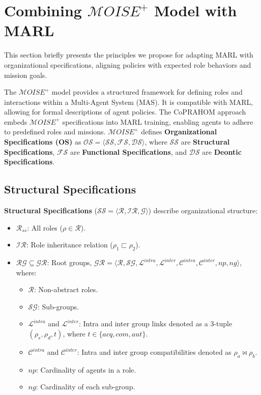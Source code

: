 \documentclass[conference]{IEEEtran}
\newcounter{relation}
\begin{document}
\section{Combining $\mathcal{M}OISE^+$ Model with MARL}
\label{sec:marl_moise_linking}

This section briefly presents the principles we propose for adapting MARL with organizational specifications, aligning policies with expected role behaviors and mission goals.

The $\mathcal{M}OISE^+$ model provides a structured framework for defining roles and interactions within a Multi-Agent System (MAS). It is compatible with MARL, allowing for formal descriptions of agent policies. The CoPRAHOM approach embeds $\mathcal{M}OISE^+$ specifications into MARL training, enabling agents to adhere to predefined roles and missions. $\mathcal{M}OISE^+$ defines \textbf{Organizational Specifications (OS)} as $\mathcal{OS} = \langle \mathcal{SS}, \mathcal{FS}, \mathcal{DS} \rangle$, where $\mathcal{SS}$ are \textbf{Structural Specifications}, $\mathcal{FS}$ are \textbf{Functional Specifications}, and $\mathcal{DS}$ are \textbf{Deontic Specifications}.

\subsection{Structural Specifications}

\textbf{Structural Specifications} ($\mathcal{SS} = \langle \mathcal{R}, \mathcal{IR}, \mathcal{G} \rangle$) describe organizational structure:
\begin{itemize}
    \item $\mathcal{R}_{ss}$: All roles ($\rho \in \mathcal{R}$).
    \item $\mathcal{IR}$: Role inheritance relation ($\rho_1 \sqsubset \rho_2$).
    \item $\mathcal{RG} \subseteq \mathcal{GR}$: Root groups, $\mathcal{GR} = \langle \mathcal{R}, \mathcal{SG}, \mathcal{L}^{intra}, \mathcal{L}^{inter}, \mathcal{C}^{intra}, \mathcal{C}^{inter}, np, ng \rangle$, where:
          \begin{itemize}
              \item $\mathcal{R}$: Non-abstract roles.
              \item $\mathcal{SG}$: Sub-groups.
              \item $\mathcal{L}^{intra}$ and $\mathcal{L}^{inter}$: Intra and inter group links denoted as a 3-tuple $(\rho_s, \rho_d, t)$, where $t \in \{acq, com, aut\}$.
              \item $\mathcal{C}^{intra}$ and $\mathcal{C}^{inter}$: Intra and inter group compatibilities denoted as $\rho_a \bowtie \rho_b$.
              \item $np$: Cardinality of agents in a role.
              \item $ng$: Cardinality of each sub-group.
          \end{itemize}
\end{itemize}
\end{document}
